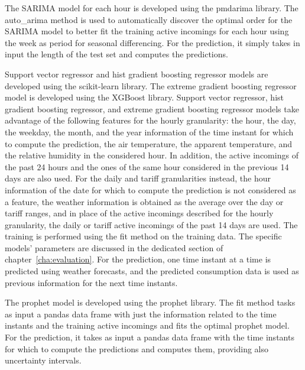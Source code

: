 The SARIMA model for each hour is developed using the pmdarima library.
The auto\_arima method is used to automatically discover the optimal order for the SARIMA model to better fit the training active incomings for each hour using the week as period for seasonal differencing.
For the prediction, it simply takes in input the length of the test set and computes the predictions.

Support vector regressor and hist gradient boosting regressor models are developed using the scikit-learn library.
The extreme gradient boosting regressor model is developed using the XGBoost library.
Support vector regressor, hist gradient boosting regressor, and extreme gradient boosting regressor models take advantage of the following features for the hourly granularity: the hour, the day, the weekday, the month, and the year information of the time instant for which to compute the prediction, the air temperature, the apparent temperature, and the relative humidity in the considered hour.
In addition, the active incomings of the past 24 hours and the ones of the same hour considered in the previous 14 days are also used.
For the daily and tariff granularities instead, the hour information of the date for which to compute the prediction is not considered as a feature, the weather information is obtained as the average over the day or tariff ranges, and in place of the active incomings described for the hourly granularity, the daily or tariff active incomings of the past 14 days are used.
The training is performed using the fit method on the training data.
The specific models’ parameters are discussed in the dedicated section of chapter~\ref{cha:evaluation}.
For the prediction, one time instant at a time is predicted using weather forecasts, and the predicted consumption data is used as previous information for the next time instants.

The prophet model is developed using the prophet library.
The fit method tasks as input a pandas data frame with just the information related to the time instants and the training active incomings and fits the optimal prophet model.
For the prediction, it takes as input a pandas data frame with the time instants for which to compute the predictions and computes them, providing also uncertainty intervals.

